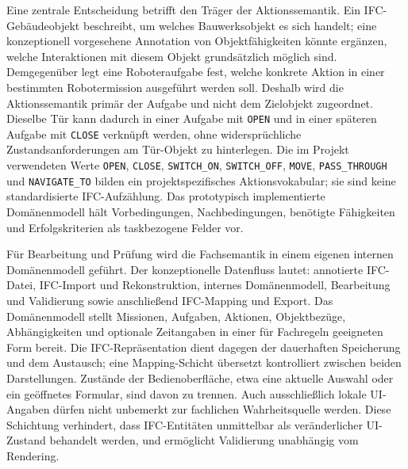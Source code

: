 Eine zentrale Entscheidung betrifft den Träger der Aktionssemantik. Ein IFC-Gebäudeobjekt beschreibt, um welches
Bauwerksobjekt es sich handelt; eine konzeptionell vorgesehene Annotation von Objektfähigkeiten könnte ergänzen, welche
Interaktionen mit diesem Objekt grundsätzlich möglich sind. Demgegenüber legt eine Roboteraufgabe fest, welche konkrete
Aktion in einer bestimmten Robotermission ausgeführt werden soll. Deshalb wird die Aktionssemantik primär der Aufgabe
und nicht dem Zielobjekt zugeordnet. Dieselbe Tür kann dadurch in einer Aufgabe mit \texttt{OPEN} und in einer späteren
Aufgabe mit \texttt{CLOSE} verknüpft werden, ohne widersprüchliche Zustandsanforderungen am Tür-Objekt zu hinterlegen.
Die im Projekt verwendeten Werte \texttt{OPEN}, \texttt{CLOSE}, \texttt{SWITCH\_ON}, \texttt{SWITCH\_OFF},
\texttt{MOVE}, \texttt{PASS\_THROUGH} und \texttt{NAVIGATE\_TO} bilden ein projektspezifisches Aktionsvokabular; sie
sind keine
standardisierte IFC-Aufzählung. Das prototypisch implementierte Domänenmodell hält Vorbedingungen, Nachbedingungen,
benötigte Fähigkeiten und Erfolgskriterien als taskbezogene Felder vor.

Für Bearbeitung und Prüfung wird die Fachsemantik in einem eigenen internen Domänenmodell geführt. Der konzeptionelle
Datenfluss lautet: annotierte IFC-Datei, IFC-Import und Rekonstruktion, internes Domänenmodell, Bearbeitung und
Validierung sowie anschließend IFC-Mapping und Export. Das Domänenmodell stellt Missionen, Aufgaben, Aktionen,
Objektbezüge, Abhängigkeiten und optionale Zeitangaben in einer für Fachregeln geeigneten Form bereit. Die
IFC-Repräsentation dient dagegen der dauerhaften Speicherung und dem Austausch; eine Mapping-Schicht übersetzt
kontrolliert zwischen beiden Darstellungen. Zustände der Bedienoberfläche, etwa eine aktuelle Auswahl oder ein
geöffnetes Formular, sind davon zu trennen. Auch ausschließlich lokale UI-Angaben dürfen nicht unbemerkt zur fachlichen
Wahrheitsquelle werden. Diese Schichtung verhindert, dass IFC-Entitäten unmittelbar als veränderlicher UI-Zustand
behandelt werden, und ermöglicht Validierung unabhängig vom Rendering.

